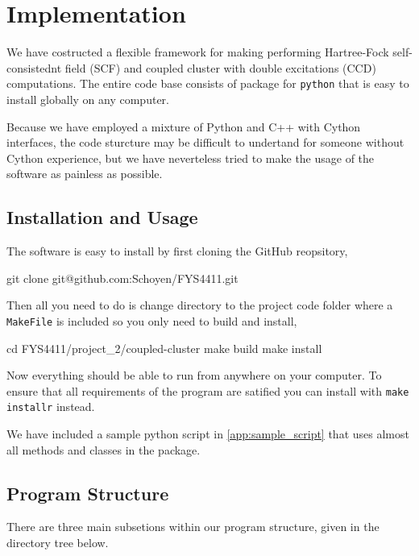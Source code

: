 \documentclass[
    a4paper, aps, twocolumn, floatfix, superscriptaddress,
    nofootinbib]{revtex4-1}
\newcommand{\1}{\mathds{1}}
\begin{document}
\section{Implementation}
    We have costructed a flexible framework for making performing Hartree-Fock 
    self-consistednt field (SCF) and coupled cluster with double excitations (CCD)
    computations. The entire code base consists of package for \lstinline{python}
    that is easy to install globally on any computer.
    
    Because we have employed a mixture of Python and C++ with Cython interfaces,
    the code sturcture may be difficult to undertand for someone without Cython
    experience, but we have neverteless tried to make the usage of the software as
    painless as possible.
    
    \subsection{Installation and Usage}

        The software is easy to install by first cloning the GitHub reopsitory,
        \begin{bash}
            git clone git@github.com:Schoyen/FYS4411.git
        \end{bash}
        Then all you need to do is change directory to the project code folder
        where a \lstinline{MakeFile} is included so you only need to build and
        install,
        \begin{bash}
            cd FYS4411/project_2/coupled-cluster
            make build
            make install
        \end{bash}
        Now everything should be able to run from anywhere on your computer.
        To ensure that all requirements of the program are satified you can
        install with \lstinline{make installr} instead.

        We have included a sample python script in \autoref{app:sample_script}
        that uses almost all methods and classes in the package. 

    \subsection{Program Structure}
        There are three main subsetions within our program structure,
        given in the directory tree below.

        \vspace{10pt}
        \vspace{10pt}
\end{document}
